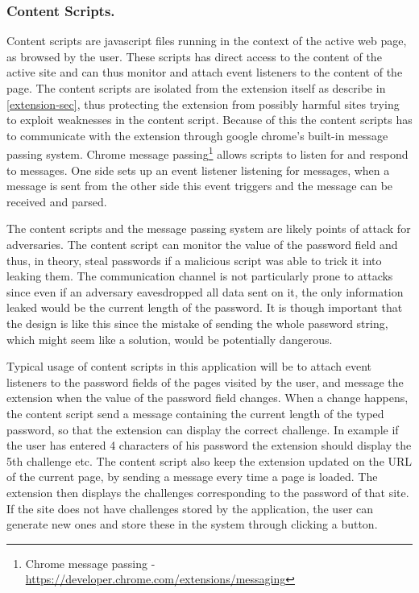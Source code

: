 \subsubsection{Content Scripts.}\label{cs}
Content scripts are javascript files running in the context of the active web page, as browsed by the user. These scripts has direct access to the content of the active site and can thus monitor and attach event listeners to the content of the page. The content scripts are isolated from the extension itself as describe in \autoref{extension-sec}, thus protecting the extension from possibly harmful sites trying to exploit weaknesses in the content script. Because of this the content scripts has to communicate with the extension through google chrome's built-in message passing system. Chrome message passing\footnote{Chrome message passing - \url{https://developer.chrome.com/extensions/messaging}} allows scripts to listen for and respond to messages. One side sets up an event listener listening for messages, when a message is sent from the other side this event triggers and the message can be received and parsed. 
\par The content scripts and the message passing system are likely points of attack for adversaries. The content script can monitor the value of the password field and thus, in theory, steal passwords if a malicious script was able to trick it into leaking them. The communication channel is not particularly prone to attacks since even if an adversary eavesdropped all data sent on it, the only information leaked would be the current length of the password. It is though important that the design is like this since the mistake of sending the whole password string, which might seem like a solution, would be potentially dangerous. 
\par Typical usage of content scripts in this application will be to attach event listeners to the password fields of the pages visited by the user, and message the extension when the value of the password field changes. When a change happens, the content script send a message containing the current length of the typed password, so that the extension can display the correct challenge. In example if the user has entered 4 characters of his password the extension should display the 5th challenge etc. The content script also keep the extension updated on the URL of the current page, by sending a message every time a page is loaded. The extension then displays the challenges corresponding to the password of that site. If the site does not have challenges stored by the application, the user can generate new ones and store these in the system through clicking a button.  

